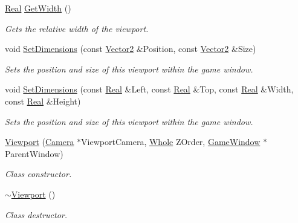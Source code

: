 \begin{DoxyCompactItemize}
\hyperlink{namespacephys_af7eb897198d265b8e868f45240230d5f}{Real} \hyperlink{classphys_1_1Viewport_af6df304a6b33f34134b29a61deb98e55}{GetWidth} ()
\begin{DoxyCompactList}\small\item\em Gets the relative width of the viewport. \item\end{DoxyCompactList}\item 
void \hyperlink{classphys_1_1Viewport_a0d0c47add1187921fd40a8c8c363bc30}{SetDimensions} (const \hyperlink{classphys_1_1Vector2}{Vector2} \&Position, const \hyperlink{classphys_1_1Vector2}{Vector2} \&Size)
\begin{DoxyCompactList}\small\item\em Sets the position and size of this viewport within the game window. \item\end{DoxyCompactList}\item 
void \hyperlink{classphys_1_1Viewport_a49269f1ada31f280adc8d832c9536514}{SetDimensions} (const \hyperlink{namespacephys_af7eb897198d265b8e868f45240230d5f}{Real} \&Left, const \hyperlink{namespacephys_af7eb897198d265b8e868f45240230d5f}{Real} \&Top, const \hyperlink{namespacephys_af7eb897198d265b8e868f45240230d5f}{Real} \&Width, const \hyperlink{namespacephys_af7eb897198d265b8e868f45240230d5f}{Real} \&Height)
\begin{DoxyCompactList}\small\item\em Sets the position and size of this viewport within the game window. \item\end{DoxyCompactList}\item 
\hyperlink{classphys_1_1Viewport_a83634ee2144fadd80fec3028885b92f2}{Viewport} (\hyperlink{classphys_1_1Camera}{Camera} $\ast$ViewportCamera, \hyperlink{namespacephys_a460f6bc24c8dd347b05e0366ae34f34a}{Whole} ZOrder, \hyperlink{classphys_1_1GameWindow}{GameWindow} $\ast$ParentWindow)
\begin{DoxyCompactList}\small\item\em Class constructor. \item\end{DoxyCompactList}\item 
\hypertarget{classphys_1_1Viewport_a2ac669dde60b69641d309e81c3108db4}{
\hyperlink{classphys_1_1Viewport_a2ac669dde60b69641d309e81c3108db4}{$\sim$Viewport} ()}
\label{classphys_1_1Viewport_a2ac669dde60b69641d309e81c3108db4}

\begin{DoxyCompactList}\small\item\em Class destructor. \item\end{DoxyCompactList}\end{DoxyCompactItemize}
